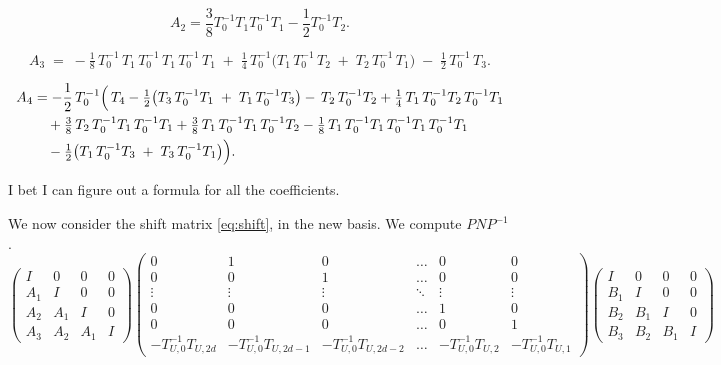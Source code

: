 {\[
A_2 =
\frac 3 8 T_0^{-1}  T_1  T_0^{-1} T_1
-  \frac 1 2 T_0^{-1}  T_2.
\]

\[
A_3 \;=\;
-\tfrac18\,T_0^{-1}\,T_1\,T_0^{-1}\,T_1\,T_0^{-1}\,T_1
\;+\;\tfrac14\,T_0^{-1}\bigl(T_1\,T_0^{-1}\,T_2 \;+\; T_2\,T_0^{-1}\,T_1\bigr)
\;-\;\tfrac12\,T_0^{-1}\,T_3.
\]


\[
\begin{aligned}
A_4 &= -\frac12\,T_0^{-1}\Bigl(\,
T_4
-\tfrac12\bigl(T_3\,T_0^{-1}T_1 \;+\; T_1\,T_0^{-1}T_3\bigr)
-\,T_2\,T_0^{-1}T_2
+\tfrac14\,T_1\,T_0^{-1}T_2\,T_0^{-1}T_1\\
&\quad
+\tfrac38\,T_2\,T_0^{-1}T_1\,T_0^{-1}T_1
+\tfrac38\,T_1\,T_0^{-1}T_1\,T_0^{-1}T_2
-\tfrac18\,T_1\,T_0^{-1}T_1\,T_0^{-1}T_1\,T_0^{-1}T_1\\
&\quad
-\tfrac12\bigl(T_1\,T_0^{-1}T_3 \;+\; T_3\,T_0^{-1}T_1\bigr)
\Bigr).
\end{aligned}
\]

I bet I can figure out a formula for all the coefficients.


\label{s:newbasisshift}We now consider the shift matrix \eqref{eq:shift}, in the new basis.
We compute $P N P^{-1}$.
$$
  \begin{pmatrix}
     I & 0 & 0 & 0 \\
    A_1 &      I & 0 & 0 \\
A_2 &     A_1 &      I & 0 \\
A_3 & A_2 &     A_1 &      I 
  \end{pmatrix}
  \begin{pmatrix}
  0 & 1  & 0 & \hdots &       0 &  0 \\
  0 & 0 &  1 & \hdots &       0 &  0 \\
\vdots & \vdots & \vdots & \ddots & \vdots & \vdots \\
  0 & 0 &  0 & \hdots &       1 &  0 \\
  0 & 0 &  0 & \hdots &       0 &  1 \\
-T^{-1}_{U,0} T_{U,2d} & -T^{-1}_{U,0}T_{U,2d-1} & -T^{-1}_{U,0}T_{U,2d-2} & \hdots & -T^{-1}_{U,0}T_{U,2} & -T^{-1}_{U,0}T_{U,1} 
  \end{pmatrix}
  \begin{pmatrix}
     I & 0 & 0 & 0 \\
    B_1 &      I & 0 & 0 \\
B_2 &     B_1 &      I & 0 \\
B_3 & B_2 &     B_1 &      I 
  \end{pmatrix}
  $$
  
}
